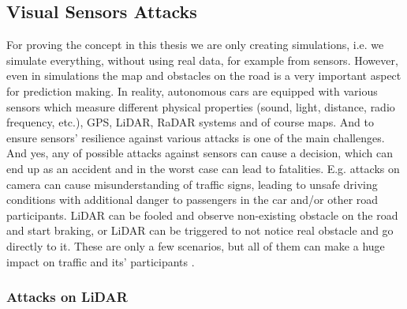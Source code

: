 \subsection{Visual Sensors Attacks}

For proving the concept in this thesis we are only creating simulations, i.e. we simulate everything, without using real data, for example from sensors. However, even in simulations the map and obstacles on the road is a very important aspect for prediction making. In reality, autonomous cars are equipped with various sensors which measure different physical properties (sound, light, distance, radio frequency, etc.), \gls{GPS}, \gls{LiDAR}, \gls{RaDAR} systems and of course maps. And to ensure sensors' resilience against various attacks is one of the main challenges. And yes, any of possible attacks against sensors can cause a decision, which can end up as an accident and in the worst case can lead to fatalities. E.g. attacks on camera can cause misunderstanding of traffic signs, leading to unsafe driving conditions with additional danger to passengers in the car and/or other road participants. \gls{LiDAR} can be fooled and observe non-existing obstacle on the road and start braking, or \gls{LiDAR} can be triggered to not notice real obstacle and go directly to it. These are only a few scenarios, but all of them can make a huge impact on traffic and its' participants \cite{AttackModel}. \\

\subsubsection{Attacks on \gls{LiDAR}}

